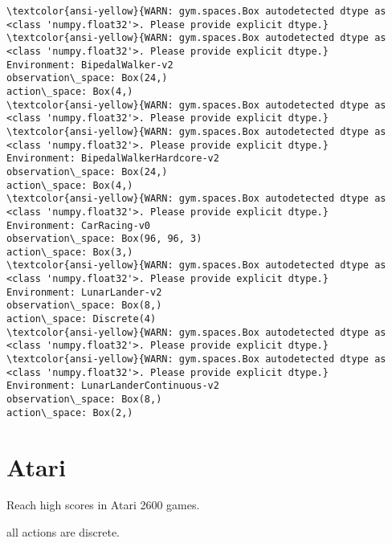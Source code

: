 \documentclass[11pt]{article}
\begin{document}
    \begin{Verbatim}[commandchars=\\\{\}]
\textcolor{ansi-yellow}{WARN: gym.spaces.Box autodetected dtype as <class 'numpy.float32'>. Please provide explicit dtype.}
\textcolor{ansi-yellow}{WARN: gym.spaces.Box autodetected dtype as <class 'numpy.float32'>. Please provide explicit dtype.}
Environment: BipedalWalker-v2
observation\_space: Box(24,)
action\_space: Box(4,)
\textcolor{ansi-yellow}{WARN: gym.spaces.Box autodetected dtype as <class 'numpy.float32'>. Please provide explicit dtype.}
\textcolor{ansi-yellow}{WARN: gym.spaces.Box autodetected dtype as <class 'numpy.float32'>. Please provide explicit dtype.}
Environment: BipedalWalkerHardcore-v2
observation\_space: Box(24,)
action\_space: Box(4,)
\textcolor{ansi-yellow}{WARN: gym.spaces.Box autodetected dtype as <class 'numpy.float32'>. Please provide explicit dtype.}
Environment: CarRacing-v0
observation\_space: Box(96, 96, 3)
action\_space: Box(3,)
\textcolor{ansi-yellow}{WARN: gym.spaces.Box autodetected dtype as <class 'numpy.float32'>. Please provide explicit dtype.}
Environment: LunarLander-v2
observation\_space: Box(8,)
action\_space: Discrete(4)
\textcolor{ansi-yellow}{WARN: gym.spaces.Box autodetected dtype as <class 'numpy.float32'>. Please provide explicit dtype.}
\textcolor{ansi-yellow}{WARN: gym.spaces.Box autodetected dtype as <class 'numpy.float32'>. Please provide explicit dtype.}
Environment: LunarLanderContinuous-v2
observation\_space: Box(8,)
action\_space: Box(2,)

    \end{Verbatim}

    \section{Atari}\label{atari}

Reach high scores in Atari 2600 games.

all actions are discrete.
\end{document}
